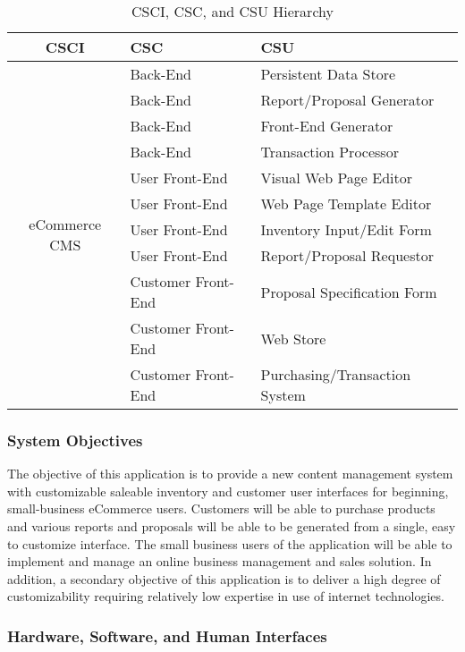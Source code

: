 \documentclass{article}
\begin{document}
\begin{table}
    \begin{tabular}{|c|l|p{7.5cm}|}\hline
        CSCI & CSC & CSU \\\hline\hline
        \multirow{12}{*}{eCommerce CMS}
         & Back-End & Persistent Data Store \\\cline{2-3}
         & Back-End & Report/Proposal Generator \\\cline{2-3}
         & Back-End & Front-End Generator \\\cline{2-3}
         & Back-End & Transaction Processor \\\cline{2-3}
         & User Front-End & Visual Web Page Editor \\\cline{2-3}
         & User Front-End & Web Page Template Editor \\\cline{2-3}
         & User Front-End & Inventory Input/Edit Form \\\cline{2-3}
         & User Front-End & Report/Proposal Requestor \\\cline{2-3}
         & Customer Front-End & Proposal Specification Form \\\cline{2-3}
         & Customer Front-End & Web Store \\\cline{2-3}
         & Customer Front-End & Purchasing/Transaction System \\\hline
    \end{tabular}
    \caption{CSCI, CSC, and CSU Hierarchy}
    \label{software-hierarchy}
\end{table}

\subsubsection{System Objectives}

The objective of this application is to provide a new content management
system with customizable saleable inventory and customer user interfaces for
beginning, small-business eCommerce users.  Customers will be able to purchase
products and various reports and proposals will
be able to be generated from a single, easy to customize interface.  The
small business users of the application will be able to implement and manage
an online business management and sales solution.  In
addition, a secondary objective of this application is to deliver a high degree
of customizability requiring relatively low expertise in use of internet
technologies.

\subsubsection{Hardware, Software, and Human Interfaces}
\label{hshi}
\end{document}

